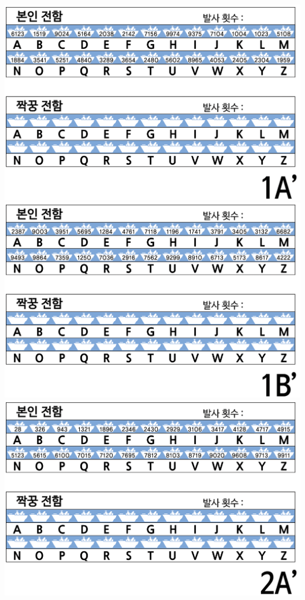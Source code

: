 \documentclass[]{article}
\begin{document}
\includegraphics{csunplugged/02-part/img/ch06-search/06-search-01-battleship-1A-dash.png}
\includegraphics{csunplugged/02-part/img/ch06-search/06-search-01-battleship-1B-dash.png}
\includegraphics{csunplugged/02-part/img/ch06-search/06-search-01-battleship-2A-dash.png}
\end{document}
